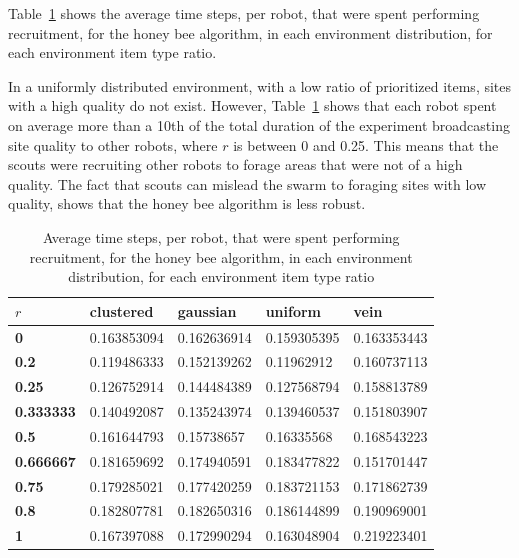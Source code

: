 Table~\ref{averagetimerecruitment} shows the average time steps, per robot, that were spent performing recruitment, for the honey bee algorithm, in each environment distribution, for each environment item type ratio. 

In a uniformly distributed environment, with a low ratio of prioritized items, sites with a high quality do not exist. However, Table~\ref{averagetimerecruitment} shows that each robot spent on average more than a 10th of the total duration of the experiment broadcasting site quality to other robots, where $r$ is between 0 and 0.25. This means that the scouts were recruiting other robots to forage areas that were not of a high quality. The fact that scouts can mislead the swarm to foraging sites with low quality, shows that the honey bee algorithm is less robust.

\begin{table}[]
\centering
\caption{Average time steps, per robot, that were spent performing recruitment, for the honey bee algorithm, in each environment distribution, for each environment item type ratio}
\label{averagetimerecruitment}
\begin{tabular}{@{}lllll@{}}
\toprule
$r$            & \textbf{clustered} & \textbf{gaussian} & \textbf{uniform} & \textbf{vein} \\ \midrule
\textbf{0}        & 0.163853094        & 0.162636914       & 0.159305395      & 0.163353443   \\
\textbf{0.2}      & 0.119486333        & 0.152139262       & 0.11962912       & 0.160737113   \\
\textbf{0.25}     & 0.126752914        & 0.144484389       & 0.127568794      & 0.158813789   \\
\textbf{0.333333} & 0.140492087        & 0.135243974       & 0.139460537      & 0.151803907   \\
\textbf{0.5}      & 0.161644793        & 0.15738657        & 0.16335568       & 0.168543223   \\
\textbf{0.666667} & 0.181659692        & 0.174940591       & 0.183477822      & 0.151701447   \\
\textbf{0.75}     & 0.179285021        & 0.177420259       & 0.183721153      & 0.171862739   \\
\textbf{0.8}      & 0.182807781        & 0.182650316       & 0.186144899      & 0.190969001   \\
\textbf{1}        & 0.167397088        & 0.172990294       & 0.163048904      & 0.219223401   \\ \bottomrule
\end{tabular}
\end{table}
